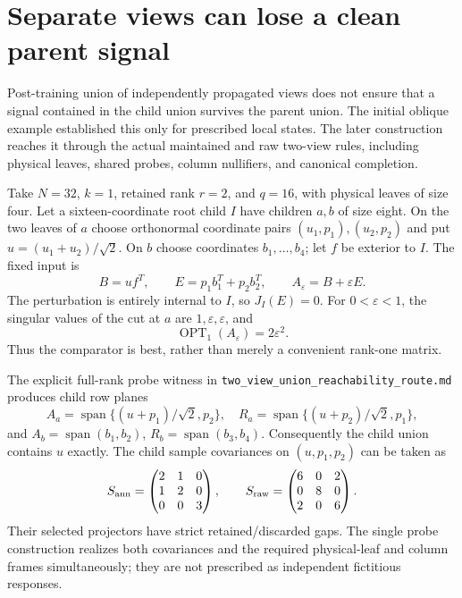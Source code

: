\documentclass[11pt,oneside,openany,a4paper]{book}
\numberwithin{equation}{chapter}
\theoremstyle{definition}
\theoremstyle{remark}
\newcommand{\sourcefile}[1]{{\small\nolinkurl{#1}}}
\begin{document}
\section{Separate views can lose a clean parent signal}
\label{upd:sec:later-separateviews}

Post-training union of independently propagated views does not ensure
that a signal contained in the child union survives the parent union.
The initial oblique example established this only for prescribed local
states.  The later construction reaches it through the actual
maintained and raw two-view rules, including physical leaves, shared
probes, column nullifiers, and canonical completion.

Take $N=32$, $k=1$, retained rank $r=2$, and $q=16$, with physical
leaves of size four.  Let a sixteen-coordinate root child $I$ have
children $a,b$ of size eight.  On the two leaves of $a$ choose
orthonormal coordinate pairs $(u_1,p_1),(u_2,p_2)$ and put
$u=(u_1+u_2)/\sqrt2$.  On $b$ choose coordinates $b_1,\ldots,b_4$;
let $f$ be exterior to $I$.  The fixed input is
\[
 B=uf^T,\qquad E=p_1b_1^T+p_2b_2^T,\qquad
 A_\varepsilon=B+\varepsilon E.
\]
The perturbation is entirely internal to $I$, so $J_I(E)=0$.
For $0<\varepsilon<1$, the singular values of the cut at $a$ are
$1,\varepsilon,\varepsilon$, and
\[
 \operatorname{OPT}_1(A_\varepsilon)=2\varepsilon^2.
\]
Thus the comparator is best, rather than merely a convenient rank-one
matrix.

The explicit full-rank probe witness in
\sourcefile{two_view_union_reachability_route.md} produces child row
planes
\[
 A_a=\operatorname{span}\{(u+p_1)/\sqrt2,p_2\},\quad
 R_a=\operatorname{span}\{(u+p_2)/\sqrt2,p_1\},
\]
and $A_b=\operatorname{span}(b_1,b_2)$,
$R_b=\operatorname{span}(b_3,b_4)$.  Consequently the child union
contains $u$ exactly.  The child sample covariances on
$(u,p_1,p_2)$ can be taken as
\[
 S_{\rm ann}=\begin{pmatrix}2&1&0\\1&2&0\\0&0&3\end{pmatrix},
 \qquad
 S_{\rm raw}=\begin{pmatrix}6&0&2\\0&8&0\\2&0&6\end{pmatrix}.
\]
Their selected projectors have strict retained/discarded gaps.  The
single probe construction realizes both covariances and the required
physical-leaf and column frames simultaneously; they are not prescribed
as independent fictitious responses.
\end{document}
